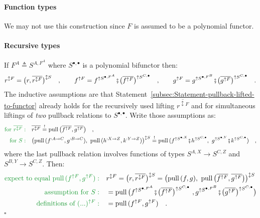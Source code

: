 \paragraph{Function types}

We may not use this construction since $F$ is assumed to be a polynomial
functor.

\paragraph{Recursive types}

If $F^{A}\triangleq S^{A,F^{A}}$ where $S^{\bullet,\bullet}$ is
a polynomial bifunctor then:
\[
r^{\updownarrow F}=\big(r,\overline{r^{\updownarrow F}}\big)^{\updownarrow S}\quad,\quad\quad f^{\uparrow F}=f^{\uparrow S^{\bullet,F^{A}}}\bef\big(\overline{f^{\uparrow F}}\big)^{\uparrow S^{C,\bullet}}\quad,\quad\quad g^{\uparrow F}=g^{\uparrow S^{\bullet,F^{B}}}\bef\big(\overline{g^{\uparrow F}}\big)^{\uparrow S^{C,\bullet}}\quad.
\]
The inductive assumptions are that Statement~\ref{subsec:Statement-pullback-lifted-to-functor}
already holds for the recursively used lifting $\overline{r^{\updownarrow F}}$
and for simultaneous liftings of \emph{two} pullback relations to
$S^{\bullet,\bullet}$. Write those assumptions as:
\begin{align*}
{\color{greenunder}\text{for }\overline{r^{\updownarrow F}}:}\quad & \overline{r^{\updownarrow F}}\overset{!}{=}\text{pull}\,\big(\overline{f^{\uparrow F}},\overline{g^{\uparrow F}}\big)\quad,\\
{\color{greenunder}\text{for }S:}\quad & \big(\text{pull}\,(f^{:A\rightarrow C},g^{:B\rightarrow C}),\,\,\text{pull}\,(h^{:X\rightarrow Z},k^{:Y\rightarrow Z})\big)^{\updownarrow S}\overset{!}{=}\text{pull}\,(f^{\uparrow S^{\bullet,X}}\bef h^{\uparrow S^{C,\bullet}},\,\,g^{\uparrow S^{\bullet,Y}}\bef k^{\uparrow S^{C,\bullet}})\quad,
\end{align*}
where the last pullback relation involves functions of types $S^{A,X}\rightarrow S^{C,Z}$
and $S^{B,Y}\rightarrow S^{C,Z}$. Then:
\begin{align*}
{\color{greenunder}\text{expect to equal }\text{pull}\,(f^{\uparrow F},g^{\uparrow F}):}\quad & r^{\updownarrow F}=\big(r,\overline{r^{\updownarrow F}}\big)^{\updownarrow S}=\big(\text{pull}\,(f,g),\,\,\text{pull}\,\big(\overline{f^{\uparrow F}},\overline{g^{\uparrow F}}\big)\big)^{\updownarrow S}\\
{\color{greenunder}\text{assumption for }S:}\quad & =\text{pull}\,\big(f^{\uparrow S^{\bullet,F^{A}}}\bef\big(\overline{f^{\uparrow F}}\big)^{\uparrow S^{C,\bullet}}\,\,,g^{\uparrow S^{\bullet,F^{B}}}\bef\big(\overline{g^{\uparrow F}}\big)^{\uparrow S^{C,\bullet}}\big)\\
{\color{greenunder}\text{definitions of }(...)^{\uparrow F}:}\quad & =\text{pull}\,(f^{\uparrow F},g^{\uparrow F})\quad.
\end{align*}
$\square$


